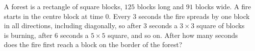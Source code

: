 A forest is a rectangle of square blocks, $125$ blocks long and $91$ blocks wide. A fire starts in the centre block at time $0$. Every $3$ seconds the fire spreads by one block in all directions, including diagonally, so after $3$ seconds a $3\times3$ square of blocks is burning, after $6$ seconds a $5\times5$ square, and so on. After how many seconds does the fire first reach a block on the border of the forest?
